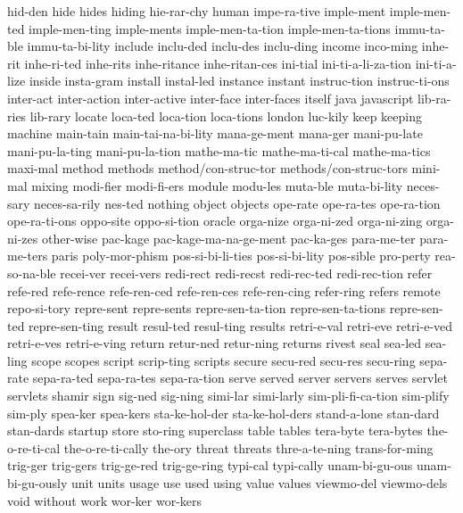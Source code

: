 {    hid-den
    hide
    hides
    hiding
    hie-rar-chy
    human
    impe-ra-tive
    imple-ment
    imple-men-ted
    imple-men-ting
    imple-ments
    imple-men-ta-tion
    imple-men-ta-tions
    immu-ta-ble
    immu-ta-bi-lity
    include
    inclu-ded
    inclu-des
    inclu-ding
    income
    inco-ming
    inhe-rit
    inhe-ri-ted
    inhe-rits
    inhe-ritance
    inhe-ritan-ces
    ini-tial
    ini-ti-a-li-za-tion
    ini-ti-a-lize
    inside
    insta-gram
    install
    instal-led
    instance
    instant
    instruc-tion
    instruc-ti-ons
    inter-act
    inter-action
    inter-active
    inter-face
    inter-faces
    itself
    java
    javascript
    lib-ra-ries
    lib-rary
    locate
    loca-ted
    loca-tion
    loca-tions
    london
    luc-kily
    keep
    keeping
    machine
    main-tain
    main-tai-na-bi-lity
    mana-ge-ment
    mana-ger
    mani-pu-late
    mani-pu-la-ting
    mani-pu-la-tion
    mathe-ma-tic
    mathe-ma-ti-cal
    mathe-ma-tics
    maxi-mal
    method
    methods
    method/con-struc-tor
    methods/con-struc-tors
    mini-mal
    mixing
    modi-fier
    modi-fi-ers
    module
    modu-les
    muta-ble
    muta-bi-lity
    neces-sary
    neces-sa-rily
    nes-ted
    nothing
    object
    objects
    ope-rate
    ope-ra-tes
    ope-ra-tion
    ope-ra-ti-ons
    oppo-site
    oppo-si-tion
    oracle
    orga-nize
    orga-ni-zed
    orga-ni-zing
    orga-ni-zes
    other-wise
    pac-kage
    pac-kage-ma-na-ge-ment
    pac-ka-ges
    para-me-ter
    para-me-ters
    paris
    poly-mor-phism
    pos-si-bi-li-ties
    pos-si-bi-lity
    pos-sible
    pro-perty
    rea-so-na-ble
    recei-ver
    recei-vers
    redi-rect
    redi-recst
    redi-rec-ted
    redi-rec-tion
    refer
    refe-red
    refe-rence
    refe-ren-ced
    refe-ren-ces
    refe-ren-cing
    refer-ring
    refers
    remote
    repo-si-tory
    repre-sent
    repre-sents
    repre-sen-ta-tion
    repre-sen-ta-tions
    repre-sen-ted
    repre-sen-ting
    result
    resul-ted
    resul-ting
    results
    retri-e-val
    retri-eve
    retri-e-ved
    retri-e-ves
    retri-e-ving
    return
    retur-ned
    retur-ning
    returns
    rivest
    seal
    sea-led
    sea-ling
    scope
    scopes
    script
    scrip-ting
    scripts
    secure
    secu-red
    secu-res
    secu-ring
    sepa-rate
    sepa-ra-ted
    sepa-ra-tes
    sepa-ra-tion
    serve
    served
    server
    servers
    serves
    servlet
    servlets
    shamir
    sign
    sig-ned
    sig-ning
    simi-lar
    simi-larly
    sim-pli-fi-ca-tion
    sim-plify
    sim-ply
    spea-ker
    spea-kers
    sta-ke-hol-der
    sta-ke-hol-ders
    stand-a-lone
    stan-dard
    stan-dards
    startup
    store
    sto-ring
    superclass
    table
    tables
    tera-byte
    tera-bytes
    the-o-re-ti-cal
    the-o-re-ti-cally
    the-ory
    threat
    threats
    thre-a-te-ning
    trans-for-ming
    trig-ger
    trig-gers
    trig-ge-red
    trig-ge-ring
    typi-cal
    typi-cally
    unam-bi-gu-ous
    unam-bi-gu-ously
    unit
    units
    usage
    use
    used
    using
    value
    values
    viewmo-del
    viewmo-dels
    void
    without
    work
    wor-ker
    wor-kers
}
